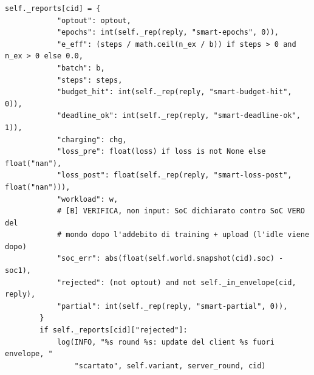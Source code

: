 \documentclass[11pt,a4paper]{article}
\begin{document}
\begin{lstlisting}[style=py,firstnumber=844,caption={\texttt{tesifl/strategies/sage\_smart.py}, lines 844--906}]
        self._reports[cid] = {
            "optout": optout,
            "epochs": int(self._rep(reply, "smart-epochs", 0)),
            "e_eff": (steps / math.ceil(n_ex / b)) if steps > 0 and n_ex > 0 else 0.0,
            "batch": b,
            "steps": steps,
            "budget_hit": int(self._rep(reply, "smart-budget-hit", 0)),
            "deadline_ok": int(self._rep(reply, "smart-deadline-ok", 1)),
            "charging": chg,
            "loss_pre": float(loss) if loss is not None else float("nan"),
            "loss_post": float(self._rep(reply, "smart-loss-post", float("nan"))),
            "workload": w,
            # [B] VERIFICA, non input: SoC dichiarato contro SoC VERO del
            # mondo dopo l'addebito di training + upload (l'idle viene dopo)
            "soc_err": abs(float(self.world.snapshot(cid).soc) - soc1),
            "rejected": (not optout) and not self._in_envelope(cid, reply),
            "partial": int(self._rep(reply, "smart-partial", 0)),
        }
        if self._reports[cid]["rejected"]:
            log(INFO, "%s round %s: update del client %s fuori envelope, "
                "scartato", self.variant, server_round, cid)
\end{lstlisting}
\end{document}
